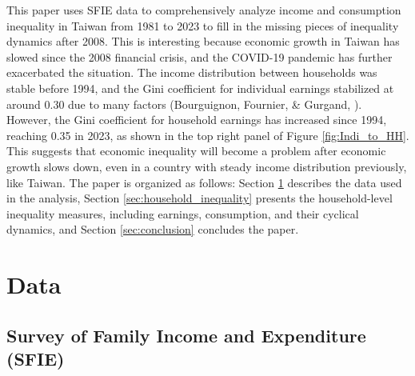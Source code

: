 \documentclass{article}
\begin{document}
This paper uses SFIE data to comprehensively analyze income and consumption inequality in Taiwan from 1981 to 2023 to fill in the missing pieces of inequality dynamics after 2008. This is interesting because economic growth in Taiwan has slowed since the 2008 financial crisis, and the COVID-19 pandemic has further exacerbated the situation.
The income distribution between households was stable before 1994, and the Gini coefficient for individual earnings stabilized at around 0.30 due to many factors (Bourguignon, Fournier, \& Gurgand, \citeyear{TW_stable_dist}).
However, the Gini coefficient for household earnings has increased since 1994, reaching 0.35 in 2023, as shown in the top right panel of Figure \ref{fig:Indi_to_HH}.
This suggests that economic inequality will become a problem after economic growth slows down, even in a country with steady income distribution previously, like Taiwan.
The paper is organized as follows: Section \ref{sec:data} describes the data used in the analysis, Section \ref{sec:household_inequality} presents the household-level inequality measures, including earnings, consumption, and their cyclical dynamics, and Section \ref{sec:conclusion} concludes the paper.

\section{Data}
\label{sec:data}

\subsection{Survey of Family Income and Expenditure (SFIE)}
\end{document}
